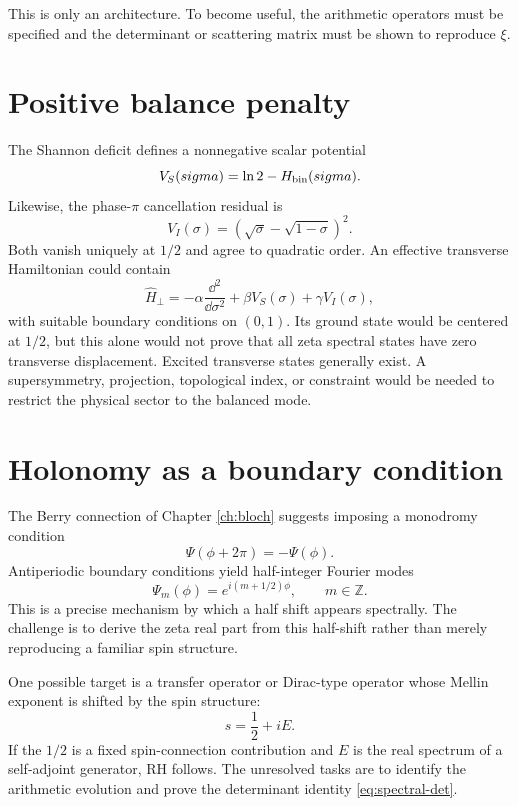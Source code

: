 This is only an architecture. To become useful, the arithmetic operators must be specified and the determinant or scattering matrix must be shown to reproduce $\xi$.

\section{Positive balance penalty}
The Shannon deficit defines a nonnegative scalar potential
\begin{equation}
V_S(sigma)=\ln2-H_{\mathrm{bin}}(sigma).
\end{equation}
Likewise, the phase-$\pi$ cancellation residual is
\begin{equation}
V_I(\sigma)=\left(\sqrt\sigma-\sqrt{1-\sigma}\right)^2.
\end{equation}
Both vanish uniquely at $1/2$ and agree to quadratic order. An effective transverse Hamiltonian could contain
\begin{equation}
\widehat H_\perp
=-\alpha\frac{\dd^2}{\dd\sigma^2}
+\beta V_S(\sigma)
+\gamma V_I(\sigma),
\end{equation}
with suitable boundary conditions on $(0,1)$. Its ground state would be centered at $1/2$, but this alone would not prove that all zeta spectral states have zero transverse displacement. Excited transverse states generally exist. A supersymmetry, projection, topological index, or constraint would be needed to restrict the physical sector to the balanced mode.

\section{Holonomy as a boundary condition}
The Berry connection of Chapter \ref{ch:bloch} suggests imposing a monodromy condition
\begin{equation}
\Psi(\phi+2\pi)=-\Psi(\phi).
\label{eq:antiperiodic}
\end{equation}
Antiperiodic boundary conditions yield half-integer Fourier modes
\begin{equation}
\Psi_m(\phi)=e^{i(m+1/2)\phi},
\qquad m\in\mathbb Z.
\end{equation}
This is a precise mechanism by which a half shift appears spectrally. The challenge is to derive the zeta real part from this half-shift rather than merely reproducing a familiar spin structure.

One possible target is a transfer operator or Dirac-type operator whose Mellin exponent is shifted by the spin structure:
\begin{equation}
s=\frac12+iE.
\end{equation}
If the $1/2$ is a fixed spin-connection contribution and $E$ is the real spectrum of a self-adjoint generator, RH follows. The unresolved tasks are to identify the arithmetic evolution and prove the determinant identity \eqref{eq:spectral-det}.

